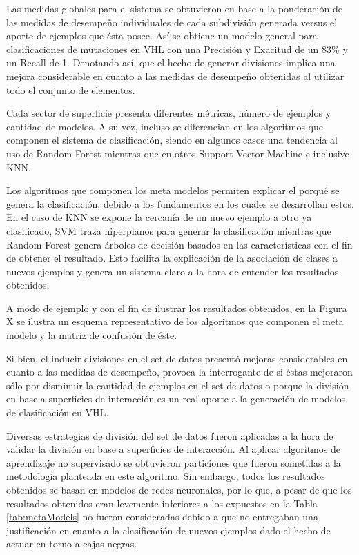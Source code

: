 Las medidas globales para el sistema se obtuvieron en base a la ponderación de las medidas de desempeño individuales de cada subdivisión generada versus el aporte de ejemplos que ésta posee. Así se obtiene un modelo general para clasificaciones de mutaciones en VHL con una Precisión y Exacitud de un 83\% y un Recall de 1. Denotando así, que el hecho de generar divisiones implica una mejora considerable en cuanto a las medidas de desempeño obtenidas al utilizar todo el conjunto de elementos.

Cada sector de superficie presenta diferentes métricas, número de ejemplos y cantidad de modelos. A su vez, incluso se diferencian en los algoritmos que componen el sistema de clasificación, siendo en algunos casos una tendencia al uso de Random Forest mientras que en otros Support Vector Machine e inclusive KNN. 

Los algoritmos que componen los meta modelos permiten explicar el porqué se genera la clasificación, debido a los fundamentos en los cuales se desarrollan estos. En el caso de KNN se expone la cercanía de un nuevo ejemplo a otro ya clasificado, SVM traza hiperplanos para generar la clasificación mientras que Random Forest genera árboles de decisión basados en las características con el fin de obtener el resultado. Esto facilita la explicación de la asociación de clases a nuevos ejemplos y genera un sistema claro a la hora de entender los resultados obtenidos.

A modo de ejemplo y con el fin de ilustrar los resultados obtenidos, en la Figura X se ilustra un esquema representativo de los algoritmos que componen el meta modelo y la matriz de confusión de éste.

Si bien, el inducir divisiones en el set de datos presentó mejoras considerables en cuanto a las medidas de desempeño, provoca la interrogante de si éstas mejoraron sólo por disminuir la cantidad de ejemplos en el set de datos o porque la división en base a superficies de interacción es un real aporte a la generación de modelos de clasificación en VHL.

Diversas estrategias de división del set de datos fueron aplicadas a la hora de validar la división en base a superficies de interacción. Al aplicar algoritmos de aprendizaje no supervisado se obtuvieron particiones que fueron sometidas a la metodología planteada en este algoritmo. Sin embargo, todos los resultados obtenidos se basan en modelos de redes neuronales, por lo que, a pesar de que los resultados obtenidos eran levemente inferiores a los expuestos en la Tabla \ref{tab:metaModels} no fueron consideradas debido a que no entregaban una justificación en cuanto a la clasificación de nuevos ejemplos dado el hecho de actuar en torno a cajas negras.

